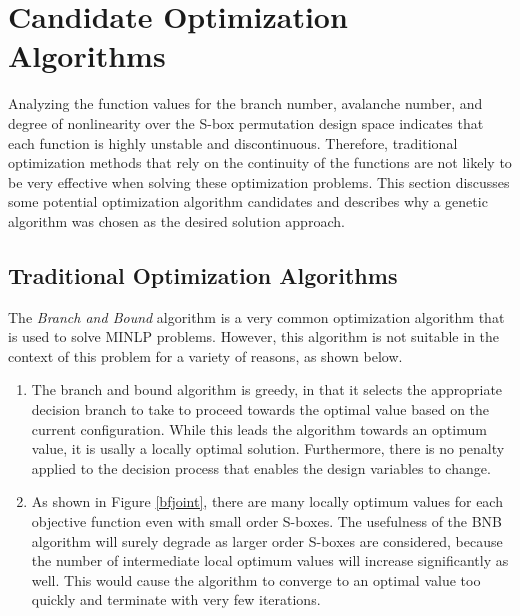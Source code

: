 \documentclass[11pt]{article}
\begin{document}
\section{Candidate Optimization Algorithms}

Analyzing the function values for the branch number, avalanche number, and degree of nonlinearity over the S-box permutation design space indicates that each function is highly unstable and discontinuous. Therefore, traditional optimization methods that rely on the continuity of the functions are not likely to be very effective when solving these optimization problems. This section discusses some potential optimization algorithm candidates and describes why a genetic algorithm was chosen as the desired solution approach.

\subsection{Traditional Optimization Algorithms}

The \emph{Branch and Bound} algorithm is a very common optimization algorithm that is used to solve MINLP problems. However, this algorithm is not suitable in the context of this problem for a variety of reasons, as shown below.

\begin{enumerate}
	\item The branch and bound algorithm is greedy, in that it selects the appropriate decision branch to take to proceed towards the optimal value based on the current configuration. While this leads the algorithm towards an optimum value, it is usally a locally optimal solution. Furthermore, there is no penalty applied to the decision process that enables the design variables to change. 
	\item As shown in Figure \ref{bfjoint}, there are many locally optimum values for each objective function even with small order S-boxes. The usefulness of the BNB algorithm will surely degrade as larger order S-boxes are considered, because the number of intermediate local optimum values will increase significantly as well. This would cause the algorithm to converge to an optimal value too quickly and terminate with very few iterations. 
\end{enumerate}
\end{document}
